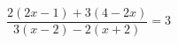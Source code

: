 \begin{ex}[type=equation]
	\begin{condition}
		$\dfrac{ 2(2x-1)+3(4-2x)}{3(x-2)-2(x+2)} = 3$
	\end{condition}
\end{ex}